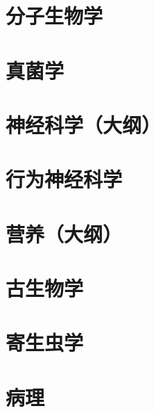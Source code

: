 \section{分子生物学}
\section{真菌学}
\section{神经科学（大纲）}
\section{行为神经科学}
\section{营养（大纲）}
\section{古生物学}
\section{寄生虫学}
\section{病理}
